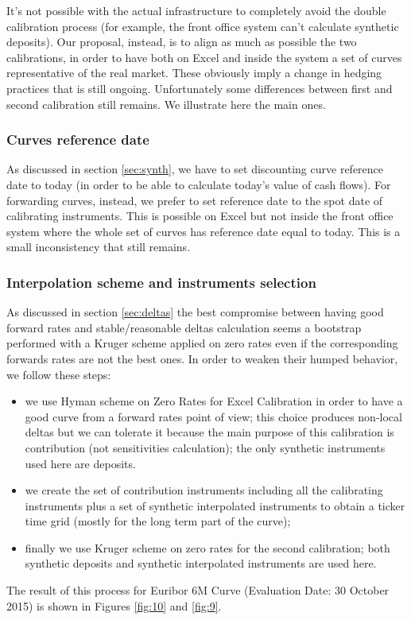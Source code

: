 It's not possible with the actual infrastructure to completely avoid the double calibration process (for example, the front office system can't calculate synthetic deposits). Our proposal, instead, is to align as much as possible the two calibrations, in order to have both on Excel and inside the system a set of curves representative of the real market. These obviously imply a change in hedging practices that is still ongoing. Unfortunately some differences between first and second calibration still remains. We illustrate here the main ones.

\subsubsection{Curves reference date}

As discussed in section \ref{sec:synth}, we have to set discounting curve reference date to today (in order to be able to calculate today's value of cash flows). For forwarding curves, instead, we prefer to set reference date to the spot date of calibrating instruments. This is possible on Excel but not inside the front office system where the whole set of curves has reference date equal to today. This is a small inconsistency that still remains.    

\subsubsection{Interpolation scheme and instruments selection}

As discussed in section \ref{sec:deltas} the best compromise between having good forward rates and stable/reasonable deltas calculation seems a bootstrap performed with a Kruger scheme applied on zero rates even if the corresponding forwards rates are not the best ones. In order to weaken their humped behavior, we follow these steps: 
\begin{itemize}
\item we use Hyman scheme on Zero Rates for Excel Calibration in order to have a good curve from a forward rates point of view; this choice produces non-local deltas but we can tolerate it because the main purpose of this calibration is contribution (not sensitivities calculation); the only synthetic instruments used here are deposits.
\item we create the set of contribution instruments including all the calibrating instruments plus a set of synthetic interpolated instruments to obtain a ticker time grid (mostly for the long term part of the curve);
\item finally we use Kruger scheme on zero rates for the second calibration; both synthetic deposits and synthetic interpolated instruments are used here.
\end{itemize}
The result of this process for Euribor 6M Curve (Evaluation Date: 30 October 2015) is shown in Figures \ref{fig:10} and \ref{fig:9}.

